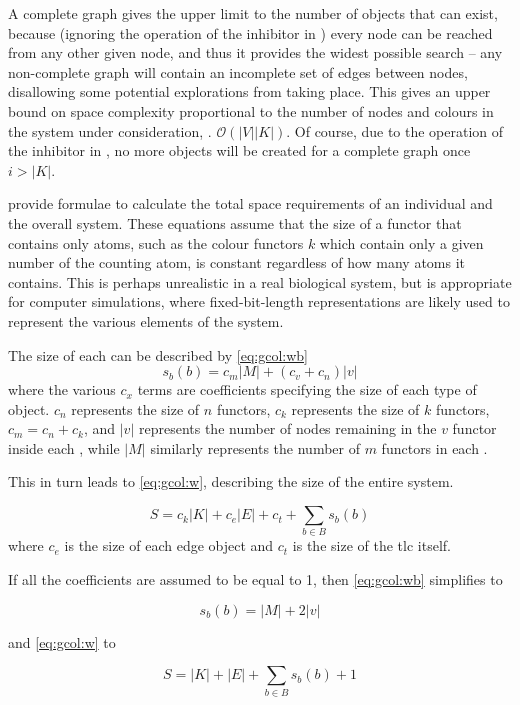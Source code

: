 A complete graph gives the upper limit to the number of objects that can exist, because (ignoring the operation of the inhibitor in ) every node can be reached from any other given node, and thus it provides the widest possible search -- any non-complete graph will contain an incomplete set of edges between nodes, disallowing some potential explorations from taking place.  This gives an upper bound on space complexity proportional to the number of nodes and colours in the system under consideration, \ie{}. \(\mathcal{O}(|V||K|)\).  Of course, due to the operation of the inhibitor in , no more \bo{} objects will be created for a complete graph once \(i > |K|\).

 provide formulae to calculate the total space requirements of an individual \bo{} and the overall system. These equations assume that the size of a functor that contains only atoms, such as the colour functors \(k\) which contain only a given number of the counting atom, is constant regardless of how many atoms it contains.  This is perhaps unrealistic in a real biological system, but is appropriate for computer simulations, where fixed-bit-length representations are likely used to represent the various elements of the system.

The size of each \bo{} can be described by \cref{eq:gcol:wb}
\begin{equation}\label{eq:gcol:wb}
    s_b(b) = c_m |M| + (c_v + c_n) |v|
\end{equation} where the various \(c_x\) terms are coefficients specifying the size of each type of object.  \(c_n\) represents the size of \(n\) functors, \(c_k\) represents the size of \(k\) functors, \(c_m = c_n + c_k\), and \(|v|\) represents the number of nodes remaining in the \(v\) functor inside each \bo{}, while \(|M|\) similarly represents the number of \(m\) functors in each \bo{}.

This in turn leads to \cref{eq:gcol:w}, describing the size of the entire system.

\begin{equation}\label{eq:gcol:w}
    S = c_k |K| + c_e |E| + c_t + \sum_{b \in B}s_b(b)
\end{equation} where \(c_e\) is the size of each edge object and \(c_t\) is the size of the \gls{tlc} itself.

If all the coefficients are assumed to be equal to 1, then \cref{eq:gcol:wb} simplifies to 

\begin{equation}
    s_b(b) = |M| + 2 |v|
\end{equation}

and \cref{eq:gcol:w} to

\begin{equation}
    S = |K| + |E| + \sum_{b \in B}s_b(b) + 1
\end{equation}